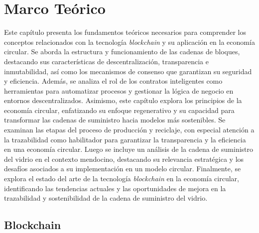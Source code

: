 \chapter[Marco Teórico]{Marco Teórico}
\label{cp:theoretical-framework}

\parindent0pt


Este capítulo presenta los fundamentos teóricos necesarios para comprender los conceptos relacionados con la tecnología \textit{blockchain} y su aplicación en la economía circular. Se aborda la estructura y funcionamiento de las cadenas de bloques, destacando sus características de descentralización, transparencia e inmutabilidad, así como los mecanismos de consenso que garantizan su seguridad y eficiencia. Además, se analiza el rol de los contratos inteligentes como herramientas para automatizar procesos y gestionar la lógica de negocio en entornos descentralizados. Asimismo, este capítulo explora los principios de la economía circular, enfatizando su enfoque regenerativo y su capacidad para transformar las cadenas de suministro hacia modelos más sostenibles. Se examinan las etapas del proceso de producción y reciclaje, con especial atención a la trazabilidad como habilitador para garantizar la transparencia y la eficiencia en una economía circular. Luego se incluye un análisis de la cadena de suministro del vidrio en el contexto mendocino, destacando su relevancia estratégica y los desafíos asociados a su implementación en un modelo circular. Finalmente, se explora el estado del arte de la tecnología \textit{blockchain} en la economía circular, identificando las tendencias actuales y las oportunidades de mejora en la trazabilidad y sostenibilidad de la cadena de suministro del vidrio.

\section{Blockchain}

